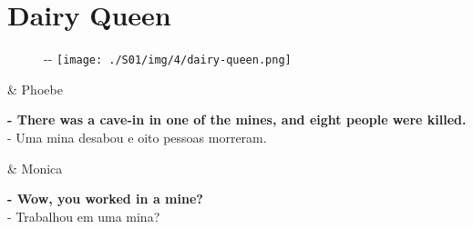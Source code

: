 \hypertarget{dairy-queen}{%
\section{Dairy Queen}\label{dairy-queen}}

\begin{figure}[!ht]
  \begin{adjustwidth}{-\oddsidemargin-1in}{-\rightmargin}
    \centering
    \texttt{[image: ./S01/img/4/dairy-queen.png]}
  \end{adjustwidth}
\end{figure}

\begin{tcolorbox}[enhanced,center upper,
    drop fuzzy shadow southeast, boxrule=0.3pt,
    lower separated=false, breakable,
    colframe=black!30!dialogoBorder,colback=white]
\begin{minipage}[c]{0.16\linewidth}
   & \centering \scriptsize{Phoebe}
\end{minipage}
\hfill
\begin{minipage}[c]{0.8\linewidth}
  \textbf{- There was a cave-in in one of the mines, and eight people were killed.}\\
  - Uma mina desabou e oito pessoas morreram.
\end{minipage}

\medskip
\begin{minipage}[c]{0.16\linewidth}
   & \centering \scriptsize{Monica}
\end{minipage}
\hfill
\begin{minipage}[c]{0.8\linewidth}
  \textbf{- Wow, you worked in a mine?}\\
  - Trabalhou em uma mina?
\end{minipage}


\end{tcolorbox}
